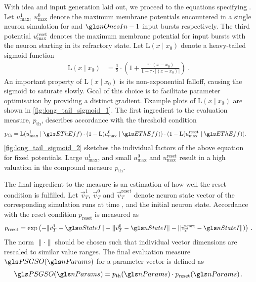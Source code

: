 With idea and input generation laid out, we proceed to the equations specifying \PSGSO. Let $u_\mathrm{max}^{1}$, $u_\mathrm{max}^{0}$ denote the maximum membrane potentials encountered in a single neuron simulation for \nOnesIn and $\nOnesIn - 1$ input bursts respectively. The third potential $u_\mathrm{max}^\mathrm{reset}$ denotes the maximum membrane potential for \nOnesIn input bursts with the neuron starting in its refractory state. Let $\mathrm{L}(x \mid x_0)$ denote a heavy-tailed sigmoid function
\begin{align}
	\mathrm{L}(x \mid x_0) &= \frac{1}2 \cdot \left( 1 + \frac{\tau \cdot (x - x_0)}{1 + \tau \cdot |(x - x_0)|} \right) \,.
	\label{eqn:logistic}
\end{align}
An important property of $\mathrm{L}(x \mid x_0)$ is its non-exponential falloff, causing the sigmoid to saturate slowly. Goal of this choice is to facilitate parameter optimisation by providing a distinct gradient. Example plots of $\mathrm{L}(x \mid x_0)$ are shown in \cref{fig:long_tail_sigmoid_1}. The first ingredient to the evaluation measure, $p_\mathrm{th}$, describes accordance with the threshold condition
\begin{align}
	p_\mathrm{th} &= \mathrm{L}(u_\mathrm{max}^{1} \mid \EThEff) \cdot (1 - \mathrm{L}(u_\mathrm{max}^{0} \mid \EThEff)) \cdot (1 - \mathrm{L}(u_\mathrm{max}^\mathrm{reset} \mid \EThEff)).
	\label{eqn:pth}
\end{align}
\cref{fig:long_tail_sigmoid_2} sketches the individual factors of the above equation for fixed potentials. Large $u_\mathrm{max}^{1}$, and small $u_\mathrm{max}^{0}$ and $u_\mathrm{max}^\mathrm{reset}$ result in a high valuation in the compound measure $p_\mathrm{th}$.

The final ingredient to the measure is an estimation of how well the reset condition is fulfilled. Let $\vec v^{1}_T$, $\vec v^{0}_T$ and $\vec v^\mathrm{reset}_T$ denote neuron state vector of the corresponding simulation runs at time \timeWindow, and \nStateI the initial neuron state. Accordance with the reset condition $p_\mathrm{reset}$ is measured as
\begin{align}
	p_\mathrm{reset} = \exp \left(- \| \vec v^{1}_T - \nStateI \| - \| \vec v^{0}_T - \nStateI \| - \| \vec v^\mathrm{reset}_T - \nStateI \|)\right) \,.
	\label{eqn:preset}
\end{align}
The norm $\|\cdot\|$ should be chosen such that individual vector dimensions are rescaled to similar value ranges. The final evaluation measure $\PSGSO(\nParams)$ for a parameter vector \nParams is defined as
\begin{align}
	\PSGSO(\nParams) = p_\mathrm{th}(\nParams)  \cdot p_\mathrm{reset}(\nParams)  \,.
	\label{eqn:psgso}
\end{align}


